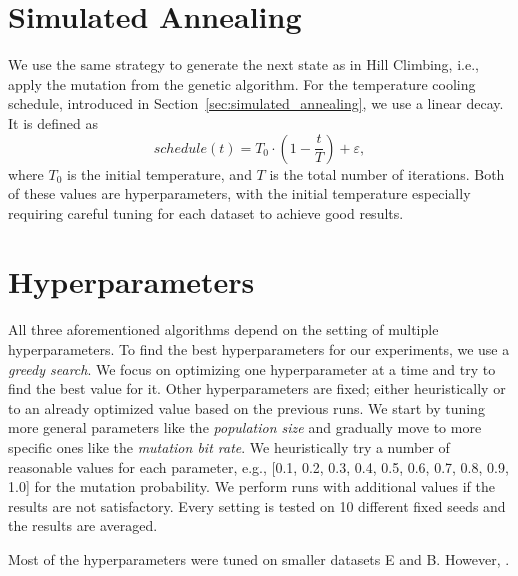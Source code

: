 \section{Simulated Annealing}

We use the same strategy to generate the next state as in Hill Climbing, i.e., apply the mutation from the genetic algorithm. For the temperature cooling schedule, introduced in Section~\ref{sec:simulated_annealing}, we use a linear decay. It is defined as
\begin{equation}
    schedule(t) = T_0 \cdot \left(1 - \frac{t}{T}\right) + \varepsilon,
\end{equation}
where $T_0$ is the initial temperature, and $T$ is the total number of iterations. Both of these values are hyperparameters, with the initial temperature especially requiring careful tuning for each dataset to achieve good results.
\section{Hyperparameters}

All three aforementioned algorithms depend on the setting of multiple hyperparameters. To find the best hyperparameters for our experiments, we use a \textit{greedy search}. We focus on optimizing one hyperparameter at a time and try to find the best value for it. Other hyperparameters are fixed; either heuristically or to an already optimized value based on the previous runs. We start by tuning more general parameters like the \textit{population size} and gradually move to more specific ones like the \textit{mutation bit rate}. We heuristically try a number of reasonable values for each parameter, e.g., [0.1, 0.2, 0.3, 0.4, 0.5, 0.6, 0.7, 0.8, 0.9, 1.0] for the mutation probability. We perform runs with additional values if the results are not satisfactory. Every setting is tested on 10 different fixed seeds and the results are averaged.

Most of the hyperparameters were tuned on smaller datasets E and B. However, .

